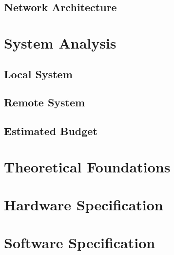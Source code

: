 \documentclass[12pt, letterpaper]{report}
\begin{document}
\section{Network Architecture}


\clearpage


\chapter{System Analysis}

\section{Local System}


\clearpage
\section{Remote System}


\clearpage
\section{Estimated Budget}


\clearpage


\chapter{Theoretical Foundations}


\clearpage
\chapter{Hardware Specification}


\clearpage
\chapter{Software Specification}

\end{document}
